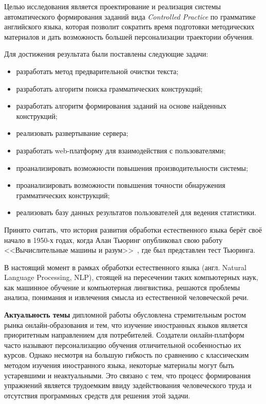 Целью исследования является проектирование и реализация системы автоматического формирования заданий вида \emph{Controlled Practice} по грамматике английского языка, которая позволит сократить время подготовки методических материалов и дать возможность большей персонализации траектории обучения.

Для достижения результата были поставлены следующие задачи:

\begin{itemize}
  \item разработать метод предварительной очистки текста;
  \item разработать алгоритм поиска грамматических конструкций;
  \item разработать алгоритм формирования заданий на основе найденных конструкций;
  \item реализовать развертывание сервера;
  \item разработать web-платформу для взаимодействия с пользователями;
  \item проанализировать возможности повышения производительности системы;
  \item проанализировать возможности повышения точности обнаружения грамматических конструкций;
  \item реализовать базу данных результатов пользователей для ведения статистики.
\end{itemize}

\newpage
\Intro
Принято считать, что история развития обработки естественного языка берёт своё начало в 1950-х годах, когда Алан Тьюринг опубликовал свою работу <<Вычислительные машины и разум>>~\cite{turing1950computing}, где был представлен тест Тьюринга.

В настоящий момент в рамках обработки естественного языка (англ. Natural Language Processing, NLP), стоящей на пересечении таких компьютерных наук, как машинное обучение и компьютерная лингвистика, решаются проблемы анализа, понимания и извлечения смысла из естественной человеческой речи.

\textbf{Актуальность темы} дипломной работы обусловлена стремительным ростом рынка онлайн-образования и тем, что изучение иностранных языков является приоритетным направлением для потребителей.
Создатели онлайн-платформ часто называют персонализацию обучения отличительной особенностью их курсов. Однако несмотря на большую гибкость по сравнению с классическим методом изучения иностранного языка, некоторые материалы могут быть устаревшими и неактуальными. Это связано с тем, что процесс формирования упражнений является трудоемким ввиду задействования человеческого труда и отсутствия программных средств для решения этой задачи.


